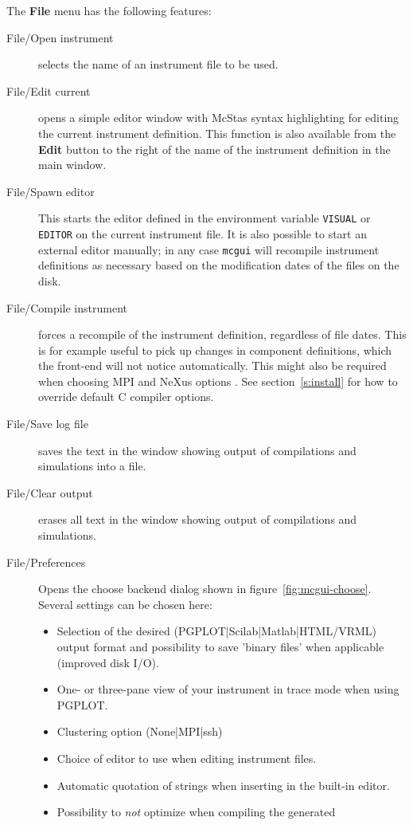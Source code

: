 The {\bf File} menu has the following features:
\begin{description}
\item[File/Open instrument] selects the name of an instrument file to be used.
\item[File/Edit current] opens a simple editor window with McStas syntax
  highlighting for editing the
  current instrument definition. This function is also available from
  the {\bf Edit} button to the right of the name of the instrument definition in
  the main window.
\item[File/Spawn editor] This starts the editor defined in the environment
  variable \verb+VISUAL+ or \verb+EDITOR+ on the current instrument
  file. It is also possible to start an external editor manually; in any
  case \verb+mcgui+ will recompile instrument definitions as necessary based on
  the modification dates of the files on the disk.
\item[File/Compile instrument] forces a recompile of the instrument definition,
  regardless of file dates. This is for example useful to pick up changes in
  component definitions, which the front-end will not notice automatically. This
  might also be required when choosing MPI  and NeXus options
  . See section~\ref{s:install} for how to override default C
  compiler options.
\item[File/Save log file] saves the text in the window showing output of
  compilations and simulations into a file.
\item[File/Clear output] erases all text in the window showing output of
  compilations and simulations.
  \item[File/Preferences] Opens the choose backend dialog shown in
  figure~\ref{fig:mcgui-choose}. Several settings can be chosen here:
\begin{itemize}
  \item Selection of  the desired (PGPLOT|Scilab|Matlab|HTML/VRML) output
    format and possibility to save 'binary files' when
  applicable (improved disk I/O).
  \item One- or three-pane view of your instrument in trace mode when
    using PGPLOT.
  \item Clustering option (None|MPI|ssh)
  \item Choice of editor to use when editing instrument files.
  \item Automatic quotation of strings when inserting in the built-in
    editor.
  \item Possibility to \emph{not} optimize when compiling the generated

\end{itemize}
\end{description}
